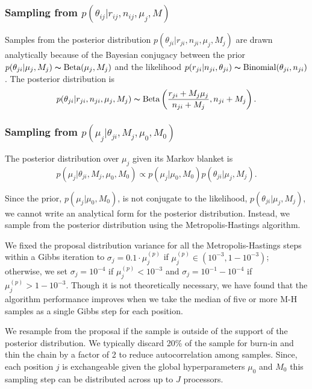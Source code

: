 \documentclass[11pt,reqno]{amsart}
\begin{document}
\subsubsection{Sampling from $p \left( \theta_{ij} |r_{ij},n_{ij},\mu_j,M \right)$}

Samples from the posterior distribution
$p(\theta_{ji} | r_{ji}, n_{ji}, \mu_j, M_j)$
are drawn analytically because of the Bayesian conjugacy between the prior
$p(\theta_{ji} | \mu_j, M_j) \thicksim \text{Beta}(\mu_j, M_j)$
and the likelihood
$p(r_{ji} | n_{ji}, \theta_{ji}) \thicksim \text{Binomial}(\theta_{ji}, n_{ji})$.
The posterior distribution is
\begin{equation}
	p(\theta_{ji} | r_{ji}, n_{ji}, \mu_j, M_j) \thicksim \text{Beta}\left( \frac{r_{ji} + M_j \mu_j}{n_{ji} + M_j} , n_{ji} + M_j\right).
\end{equation}

\subsubsection{Sampling from $p \left( \mu_j |\theta_{ji},M_j,\mu_0,M_0\right)$}
The posterior distribution over $\mu_j$ given its Markov blanket is
\begin{equation}
	p( \mu_j | \theta_{ji}, M_j, \mu_0, M_0 ) \propto p(\mu_j | \mu_0, M_0) p(\theta_{ji} | \mu_j, M_j).
\end{equation}

Since the prior, $p(\mu_j | \mu_0, M_0)$, is not conjugate to the likelihood, $p(\theta_{ji} | \mu_j, M_j)$, we cannot write an analytical form for the posterior distribution. Instead, we sample from the posterior distribution using the Metropolis-Hastings algorithm.

We fixed the proposal distribution variance for all the Metropolis-Hastings steps within a Gibbs iteration to $\sigma_j = 0.1 \cdot \mu_j^{(p)}$ if $\mu_j^{(p)} \in (10^{-3},1-10^{-3})$; otherwise, we set $\sigma_j = 10^{-4}$ if $\mu_j^{(p)}< 10^{-3}$ and $\sigma_j = 10^{-1}-10^{-4}$ if $\mu_j^{(p)}>1-10^{-3}$. Though it is not theoretically necessary, we have found that the algorithm performance improves when we take the median of five or more M-H samples as a single Gibbs step for each position.


We resample from the proposal if the sample is outside of the support of the posterior distribution. We typically discard 20\% of the sample for burn-in and thin the chain by a factor of 2 to reduce autocorrelation among samples. Since, each position $j$ is exchangeable given the global hyperparameters $\mu_0$ and $M_0$ this sampling step can be distributed across up to $J$ processors.
\end{document}

